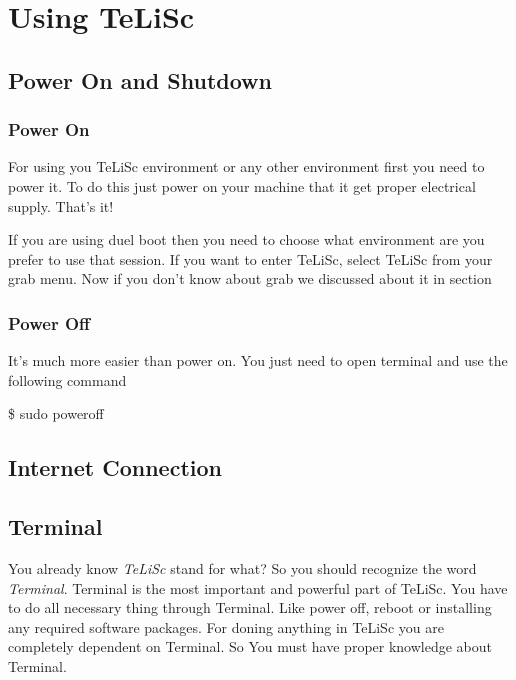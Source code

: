\chapter{Using TeLiSc}
\label{using}



\section{Power On and Shutdown}
\label{sec:3.1}

\subsection{Power On}
For using you TeLiSc environment or any other environment first you need to power it. To do this just power on your machine that it get proper electrical supply. That's it!

If you are using duel boot then you need to choose what environment are you prefer to use that session. If you want to enter TeLiSc, select TeLiSc from your grab menu. Now if you don't know about grab we discussed about it in section  

\subsection{Power Off}

It's much more easier than power on. You just need to open terminal and use the following command 

\begin{svgraybox}
\$ sudo poweroff
\end{svgraybox}


\section{Internet Connection}
\label{3.2}


\section{Terminal}
\label{3.3}

You already know \textit{TeLiSc} stand for what? So you should recognize the word \textit{Terminal}. Terminal is the most important and powerful part of TeLiSc. You have to do all necessary thing through Terminal. Like power off, reboot or installing any required software packages. For doning anything in TeLiSc you are completely dependent on Terminal. So You must have proper knowledge about Terminal.

